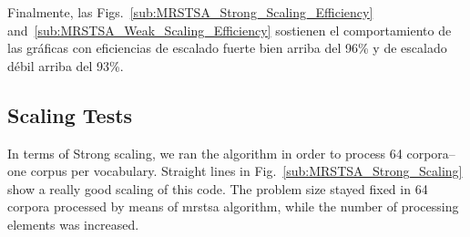 {Finalmente, las Figs.~\ref{sub:MRSTSA_Strong_Scaling_Efficiency} and~\ref{sub:MRSTSA_Weak_Scaling_Efficiency} sostienen el comportamiento de las gráficas con eficiencias de escalado fuerte bien arriba del 96\% y de escalado débil arriba del 93\%. 
}{
\subsection{ Scaling Tests}
\label{MRSTSA_Scaling_Tests}

In terms of Strong scaling, we ran the algorithm in order to process 64 corpora--one corpus per vocabulary. Straight lines in Fig.~\ref{sub:MRSTSA_Strong_Scaling} show a really good scaling of this code. The problem size stayed fixed in 64 corpora processed by means of \gls{mrstsa} algorithm, while the number of processing elements was increased.

}

